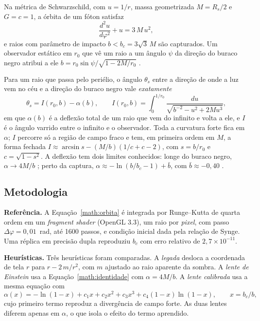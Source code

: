 \documentclass[a4paper, 12pt, twoside]{article}
\begin{document}
Na métrica de Schwarzschild, com $u = 1/r$, massa geometrizada
$M = R_s/2$ e $G = c = 1$, a órbita de um fóton satisfaz
\cite{hartle2003gravity}
\begin{equation}
\label{math:orbita}
\frac{d^2u}{d\varphi^2} + u = 3\,M\,u^2 ,
\end{equation}
e raios com parâmetro de impacto $b < b_c = 3\sqrt{3}\,M$ são
capturados. Um observador estático em $r_0$ que vê um raio a um ângulo
$\psi$ da direção do buraco negro atribui a ele
$b = r_0 \sin\psi / \sqrt{1 - 2M/r_0}$ \cite{synge1966escape}.

Para um raio que passa pelo periélio, o ângulo $\theta_s$ entre a direção
de onde a luz vem no céu e a direção do buraco negro vale
\emph{exatamente}
\begin{equation}
\label{math:identidade}
\theta_s = I(r_0, b) - \alpha(b), \qquad
I(r_0,b) = \int_0^{1/r_0} \frac{du}{\sqrt{b^{-2} - u^2 + 2Mu^3}} ,
\end{equation}
em que $\alpha(b)$ é a deflexão total de um raio que vem do infinito e
volta a ele, e $I$ é o ângulo varrido entre o infinito e o observador.
Toda a curvatura forte fica em $\alpha$; $I$ percorre só a região de
campo fraco e tem, em primeira ordem em $M$, a forma fechada
$I \approx \arcsin s - (M/b)(1/c + c - 2)$, com $s = b/r_0$ e
$c = \sqrt{1 - s^2}$. A deflexão tem dois limites conhecidos: longe do
buraco negro, $\alpha \to 4M/b$ \cite{einstein1936lens}; perto da
captura, $\alpha \approx -\ln(b/b_c - 1) + \bar b$, com
$\bar b \approx -0{,}40$ \cite{bozza2002strong}.

\subsection{Metodologia}

\textbf{Referência.} A Equação~\ref{math:orbita} é integrada por
Runge--Kutta de quarta ordem em um \emph{fragment shader} (OpenGL 3.3),
um raio por \emph{pixel}, com passo $\Delta\varphi = 0{,}01$~rad, até
1600 passos, e condição inicial dada pela relação de Synge. Uma réplica
em precisão dupla reproduziu $b_c$ com erro relativo de
$2{,}7\times10^{-11}$.

\textbf{Heurísticas.} Três heurísticas foram comparadas. A
\emph{legada} desloca a coordenada de tela $r$ para
$r - 2\,m/r^2$, com $m$ ajustado ao raio aparente da sombra. A
\emph{lente de Einstein} usa a Equação~\ref{math:identidade} com
$\alpha = 4M/b$. A \emph{lente calibrada} usa a mesma equação com
\begin{equation}
\label{math:alfa}
\alpha(x) = -\ln(1-x) + c_1 x + c_2 x^2 + c_3 x^3 + c_4 (1-x)\ln(1-x),
\qquad x = b_c/b ,
\end{equation}
cujo primeiro termo reproduz a divergência de campo forte. As duas lentes
diferem apenas em $\alpha$, o que isola o efeito do termo aprendido.
\end{document}
